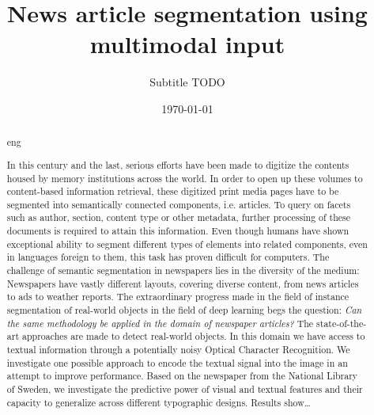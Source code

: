 \documentclass[english, bibtex]{kththesis}
\title{News article segmentation using multimodal input}
\subtitle{Subtitle TODO}
\date{\today}
\begin{document}
%

\titlepage
\bookinfopage

\frontmatter
\setcounter{page}{1}
\begin{abstract}
  \markboth{\abstractname}{}
\begin{scontents}[store-env=lang]
eng
\end{scontents}
\begin{scontents}[store-env=abstracts,print-env=true]

In this century and the last, serious efforts have been made to digitize the contents housed by memory institutions across the world. In order to open up these volumes to content-based information retrieval, these digitized print media pages have to be segmented into semantically connected components, i.e. articles. To query on facets such as author, section, content type or other metadata, further processing of these documents is required to attain this information.  
Even though humans have shown exceptional ability to segment different types of elements into related components, even in languages foreign to them, this task has proven difficult for computers. The challenge of semantic segmentation in newspapers lies in the diversity of the medium: Newspapers have vastly different layouts, covering diverse content, from news articles to ads to weather reports.
The extraordinary progress made in the field of instance segmentation of real-world objects in the field of deep learning begs the question: \textit{Can the same methodology be applied in the domain of newspaper articles?}
The state-of-the-art approaches are made to detect real-world objects. In this domain we have access to textual information through a potentially noisy Optical Character Recognition. We investigate one possible approach to encode the textual signal into the image in an attempt to improve performance. 
Based on the newspaper from the National Library of Sweden, we investigate the predictive power of visual and textual features and their capacity to generalize across different typographic designs. Results show…



\end{scontents}
\end{abstract}
\end{document}
